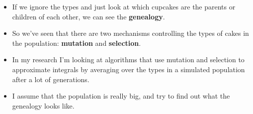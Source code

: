 \documentclass{article}
\begin{document}
\begin{itemize}
\item If we ignore the types and just look at which cupcakes are the parents or children of each other, we can see the \textbf{genealogy}.
\item So we've seen that there are two mechanisms controlling the types of cakes in the population: \textbf{mutation} and \textbf{selection}.
\item In my research I'm looking at algorithms that use mutation and selection to approximate integrals by averaging over the types in a simulated population after a lot of generations.
\item I assume that the population is really big, and try to find out what the genealogy looks like.
\end{itemize}
\end{document}
